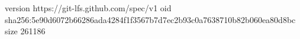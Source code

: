 version https://git-lfs.github.com/spec/v1
oid sha256:5e90d6072b66286ada4284f1f3567b7d7ec2b93c0a7638710b82b060ea80d8bc
size 261186
